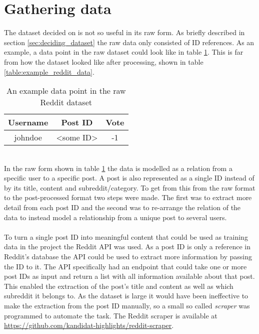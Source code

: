 \section{Gathering data}\label{sec:gathering_data}
The dataset decided on is not so useful in its raw form. As briefly described in section \ref{sec:deciding_dataset} the raw data only consisted of ID references. As an example, a data point in the raw dataset could look like in table \ref{table:raw_reddit_data}. This is far from how the dataset looked like after processing, shown in table \ref{table:example_reddit_data}.
\begin{table}[h!]
    \centering
    \begin{tabular}{ |c|c|c| } 
        \hline
        \textbf{Username} & \textbf{Post ID} & \textbf{Vote} \\
        \hline
        \hline
        johndoe & <some ID> & -1\\
        \hline
    \end{tabular}
    \caption{An example data point in the raw Reddit dataset}
    \label{table:raw_reddit_data}
\end{table}
\\
In the raw form shown in table \ref{table:raw_reddit_data} the data is modelled as a relation from a specific user to a specific post. A post is also represented as a single ID instead of by its title, content and subreddit/category. To get from this from the raw format to the post-processed format two steps were made. The first was to extract more detail from each post ID and the second was to re-arrange the relation of the data to instead model a relationship from a unique post to several users.
\\\\
To turn a single post ID into meaningful content that could be used as training data in the project the Reddit API was used. As a post ID is only a reference in Reddit's database the API could be used to extract more information by passing the ID to it. The API specifically had an endpoint that could take one or more post IDs as input and return a list with all information available about that post. This enabled the extraction of the post's title and content as well as which subreddit it belongs to. As the dataset is large it would have been ineffective to make the extraction from the post ID manually, so a small so called \textit{scraper} was programmed to automate the task. The Reddit scraper is available at \url{https://github.com/kandidat-highlights/reddit-scraper}.
\\\\
